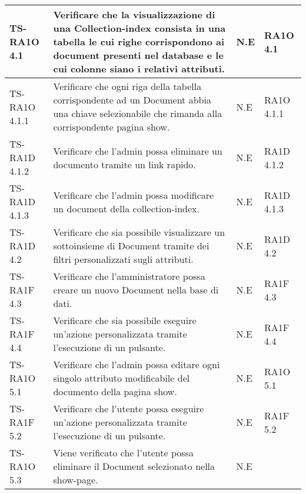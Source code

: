 \begin{center}
\begin{longtable}{| p{3cm} | p{6cm} | p{1.5cm} | p{2cm} | }
        TS-RA1O 4.1 & 
        Verificare che la visualizzazione di una Collection-index consista in una tabella le cui righe corrispondono ai document presenti nel database e le cui colonne siano i relativi attributi. & N.E &       
            RA1O 4.1 \newline  \\ \hline 
        TS-RA1O 4.1.1 & 
        Verificare che ogni riga della tabella corrispondente ad un Document abbia una chiave selezionabile che rimanda alla corrispondente pagina show.
 & N.E &       
            RA1O 4.1.1 \newline  \\ \hline 
        TS-RA1D 4.1.2 & 
        Verificare che l'admin possa eliminare un documento tramite un link rapido. & N.E &       
            RA1D 4.1.2 \newline  \\ \hline 
        TS-RA1D 4.1.3 & 
        Verificare che l'admin possa modificare un document della collection-index.
 & N.E &       
            RA1D 4.1.3 \newline  \\ \hline 
        TS-RA1D 4.2 & 
        Verificare che sia possibile visualizzare un sottoinsieme di Document tramite dei filtri personalizzati sugli attributi. & N.E &       
            RA1D 4.2 \newline  \\ \hline 
        TS-RA1F 4.3 & 
        Verificare che l'amministratore possa creare un nuovo Document nella base di dati. & N.E &       
            RA1F 4.3 \newline  \\ \hline 
        TS-RA1F 4.4 & 
        Verificare che sia possibile eseguire un'azione personalizzata tramite l'esecuzione di un pulsante. & N.E &       
            RA1F 4.4 \newline  \\ \hline 
        TS-RA1O 5.1 & 
        Verificare che l'admin possa editare ogni singolo attributo modificabile del documento della pagina show. & N.E &       
            RA1O 5.1 \newline  \\ \hline 
        TS-RA1F 5.2 & 
        Verificare che l'utente possa eseguire un'azione personalizzata tramite l'esecuzione di un pulsante. & N.E &       
            RA1F 5.2 \newline  \\ \hline 
        TS-RA1O 5.3 & 
        Viene verificato che l'utente possa eliminare il Document selezionato nella show-page. & N.E &       

\end{longtable}
\end{center}
